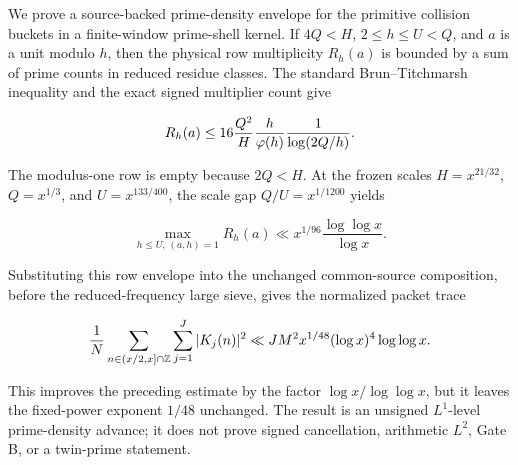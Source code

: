 We prove a source-backed prime-density envelope for the primitive collision
buckets in a finite-window prime-shell kernel.  If $4Q<H$,
$2\leq h\leq U<Q$, and $a$ is a unit modulo $h$, then the physical row
multiplicity $R_h(a)$ is bounded by a sum of prime counts in reduced residue
classes.  The standard Brun--Titchmarsh inequality and the exact signed
multiplier count give

\[
 R_h(a)
 \leq 16\frac{Q^2}{H}\frac{h}{\varphi(h)}
       \frac{1}{\log(2Q/h)}.
\]

The modulus-one row is empty because $2Q<H$.  At the frozen scales
$H=x^{21/32}$, $Q=x^{1/3}$, and $U=x^{133/400}$, the scale gap
$Q/U=x^{1/1200}$ yields

\[
 \max_{h\leq U,\,(a,h)=1}R_h(a)
 \ll x^{1/96}\frac{\log\log x}{\log x}.
\]

Substituting this row envelope into the unchanged common-source composition,
before the reduced-frequency large sieve, gives the normalized packet trace

\[
 \frac1N\sum_{n\in(x/2,x]\cap\mathbb Z}\sum_{j=1}^{J}|K_j(n)|^2
 \ll J M^2x^{1/48}(\log x)^4\log\log x.
\]

This improves the preceding estimate by the factor
$\log x/\log\log x$, but it leaves the fixed-power exponent $1/48$
unchanged.  The result is an unsigned $L^1$-level prime-density advance; it
does not prove signed cancellation, arithmetic $L^2$, Gate B, or a
twin-prime statement.
